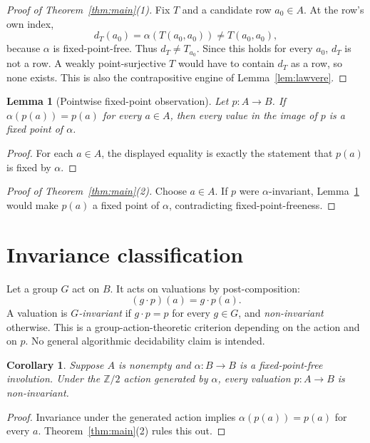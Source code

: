 \documentclass[11pt]{article}
\newtheorem{lemma}[theorem]{Lemma}
\newtheorem{corollary}[theorem]{Corollary}
\theoremstyle{definition}
\theoremstyle{remark}
\begin{document}
\begin{proof}[Proof of Theorem~\ref{thm:main}(1)]
Fix $T$ and a candidate row $a_0\in A$. At the row's own index,
\[
d_T(a_0)=\alpha(T(a_0,a_0))\neq T(a_0,a_0),
\]
because $\alpha$ is fixed-point-free. Thus $d_T\neq T_{a_0}$. Since this holds for every $a_0$, $d_T$ is not a row. A weakly point-surjective $T$ would have to contain $d_T$ as a row, so none exists. This is also the contrapositive engine of Lemma~\ref{lem:lawvere}.
\end{proof}

\begin{lemma}[Pointwise fixed-point observation]
\label{lem:pointwise}
Let $p\colon A\to B$. If $\alpha(p(a))=p(a)$ for every $a\in A$, then every value in the image of $p$ is a fixed point of $\alpha$.
\end{lemma}

\begin{proof}
For each $a\in A$, the displayed equality is exactly the statement that $p(a)$ is fixed by $\alpha$.
\end{proof}

\begin{proof}[Proof of Theorem~\ref{thm:main}(2)]
Choose $a\in A$. If $p$ were $\alpha$-invariant, Lemma~\ref{lem:pointwise} would make $p(a)$ a fixed point of $\alpha$, contradicting fixed-point-freeness.
\end{proof}

\section{Invariance classification}
\label{sec:classification}

Let a group $G$ act on $B$. It acts on valuations by post-composition:
\[
(g\cdot p)(a)=g\cdot p(a).
\]
A valuation is \emph{$G$-invariant} if $g\cdot p=p$ for every $g\in G$, and \emph{non-invariant} otherwise. This is a group-action-theoretic criterion depending on the action and on $p$. No general algorithmic decidability claim is intended.

\begin{corollary}
\label{cor:classification}
Suppose $A$ is nonempty and $\alpha\colon B\to B$ is a fixed-point-free involution. Under the $\mathbb{Z}/2$ action generated by $\alpha$, every valuation $p\colon A\to B$ is non-invariant.
\end{corollary}

\begin{proof}
Invariance under the generated action implies $\alpha(p(a))=p(a)$ for every $a$. Theorem~\ref{thm:main}(2) rules this out.
\end{proof}
\end{document}
